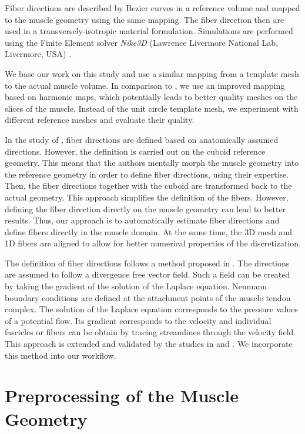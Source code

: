 Fiber directions are described by Bezier curves in a reference volume and mapped to the muscle geometry using the same mapping. The fiber direction then are used in a transversely-isotropic material formulation. Simulations are performed using the Finite Element solver \emph{Nike3D} (Lawrence Livermore National Lab, Livermore, USA) \cite{Nike3D}.

We base our work on this study and use a similar mapping from a template mesh to the actual muscle volume. In comparison to \cite{blemker2005three}, we use an improved mapping based on harmonic maps, which potentially leads to better quality meshes on the slices of the muscle. Instead of the unit circle template mesh, we experiment with different reference meshes and evaluate their quality.

In the study of \cite{blemker2005three}, fiber directions are defined based on anatomically assumed directions.
However, the definition is carried out on the cuboid reference geometry. This means that the authors mentally morph the muscle geometry into the reference geometry in order to define fiber directions, using their expertise. Then, the fiber directions together with the cuboid are transformed back to the actual geometry. This approach simplifies the definition of the fibers. However, defining the fiber direction directly on the muscle geometry can lead to better results. Thus, our approach is to automatically estimate fiber directions and define fibers directly in the muscle domain. At the same time, the 3D mesh and 1D fibers are aligned to allow for better numerical properties of the discretization. 

The definition of fiber directions follows a method proposed in \cite{Choi2013}. 
The directions are assumed to follow a divergence free vector field. Such a field can be created by taking the gradient of the solution of the Laplace equation. Neumann boundary conditions are defined at the attachment points of the muscle tendon complex. The solution of the Laplace equation corresponds to the pressure values of a potential flow. Its gradient corresponds to the velocity and individual fascicles or fibers can be obtain by tracing streamlines through the velocity field.
This approach is extended and validated by the studies in \cite{Inouye2015} and \cite{Handsfield2017}. We incorporate this method into our workflow.

\section{Preprocessing of the Muscle Geometry}\label{sec:preprocessing_of_the_muscle_geometry}

